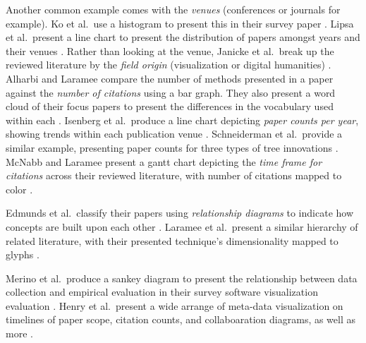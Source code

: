 Another common example comes with the \textit{venues} (conferences or journals for example). Ko et al.\ use a histogram to present this in their survey paper \cite{ko2016survey}.  Lipsa et al.\ present a line chart to present the distribution of papers amongst years and their venues \cite{lipsa2012visualization}.
Rather than looking at the venue, Janicke et al.\ break up the reviewed literature by the \textit{field origin} (visualization or digital humanities) \cite{janicke2016visual}. Alharbi and Laramee compare the number of methods presented in a paper against the \textit{number of citations} using a bar graph. They also present a word cloud of their focus papers to present the differences in the vocabulary used within each \cite{alharbi2018sos}. Isenberg et al.\ produce a line chart depicting \textit{paper counts per year}, showing trends within each publication venue \cite{isenberg2017VPD}. Schneiderman et al.\ provide a similar example, presenting paper counts for three types of tree innovations \cite{schneiderman2012innovation}.
McNabb and Laramee present a gantt chart depicting the \textit{time frame for citations} across their reviewed literature, with number of citations mapped to color \cite{mcnabb2017sos}. 

Edmunds et al.\ classify their papers using \textit{relationship diagrams} to indicate how concepts are built upon each other \cite{edmunds2012surface}. Laramee et al.\ present a similar hierarchy of related literature, with their presented technique's dimensionality mapped to glyphs \cite{laramee2004state}.

Merino et al.\ produce a sankey diagram to present the relationship between data collection and empirical evaluation in their survey software visualization evaluation \cite{merino2018systematic}.
Henry et al.\ present a  wide arrange of meta-data visualization on timelines of paper scope, citation counts, and collaboaration diagrams, as well as more \cite{henry200720}.

